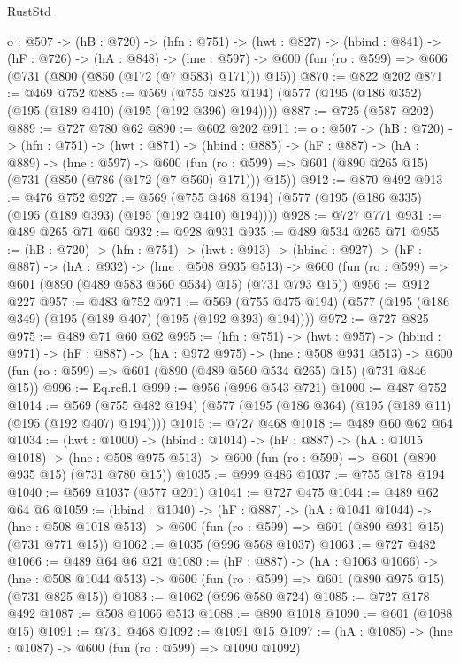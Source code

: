 \begin{lexlean}{RustStd}
\begin{coremodule}
  {o : @507} ->
  (hB : @720) ->
  (hfn : @751) ->
  (hwt : @827) ->
  (hbind : @841) ->
  (hF : @726) ->
  (hA : @848) ->
  (hne : @597) -> @600 (fun (ro : @599) => @606 (@731 (@800 (@850 (@172 (@7 @583) @171))) @15))
@870 := @822 @202
@871 := @469 @752
@885 := @569 (@755 @825 @194) (@577 (@195 (@186 @352) (@195 (@189 @410) (@195 (@192 @396) @194))))
@887 := @725 (@587 @202)
@889 := @727 @780 @62
@890 := @602 @202
@911 := {o : @507} ->
  (hB : @720) ->
  (hfn : @751) ->
  (hwt : @871) ->
  (hbind : @885) ->
  (hF : @887) ->
  (hA : @889) ->
  (hne : @597) ->
  @600 (fun (ro : @599) => @601 (@890 @265 @15) (@731 (@850 (@786 (@172 (@7 @560) @171))) @15))
@912 := @870 @492
@913 := @476 @752
@927 := @569 (@755 @468 @194) (@577 (@195 (@186 @335) (@195 (@189 @393) (@195 (@192 @410) @194))))
@928 := @727 @771
@931 := @489 @265 @71 @60
@932 := @928 @931
@935 := @489 @534 @265 @71
@955 := (hB : @720) ->
  (hfn : @751) ->
  (hwt : @913) ->
  (hbind : @927) ->
  (hF : @887) ->
  (hA : @932) ->
  (hne : @508 @935 @513) ->
  @600 (fun (ro : @599) => @601 (@890 (@489 @583 @560 @534) @15) (@731 @793 @15))
@956 := @912 @227
@957 := @483 @752
@971 := @569 (@755 @475 @194) (@577 (@195 (@186 @349) (@195 (@189 @407) (@195 (@192 @393) @194))))
@972 := @727 @825
@975 := @489 @71 @60 @62
@995 := (hfn : @751) ->
  (hwt : @957) ->
  (hbind : @971) ->
  (hF : @887) ->
  (hA : @972 @975) ->
  (hne : @508 @931 @513) ->
  @600 (fun (ro : @599) => @601 (@890 (@489 @560 @534 @265) @15) (@731 @846 @15))
@996 := Eq.refl.{1}
@999 := @956 (@996 @543 @721)
@1000 := @487 @752
@1014 := @569 (@755 @482 @194) (@577 (@195 (@186 @364) (@195 (@189 @11) (@195 (@192 @407) @194))))
@1015 := @727 @468
@1018 := @489 @60 @62 @64
@1034 := (hwt : @1000) ->
  (hbind : @1014) ->
  (hF : @887) ->
  (hA : @1015 @1018) ->
  (hne : @508 @975 @513) -> @600 (fun (ro : @599) => @601 (@890 @935 @15) (@731 @780 @15))
@1035 := @999 @486
@1037 := @755 @178 @194
@1040 := @569 @1037 (@577 @201)
@1041 := @727 @475
@1044 := @489 @62 @64 @6
@1059 := (hbind : @1040) ->
  (hF : @887) ->
  (hA : @1041 @1044) ->
  (hne : @508 @1018 @513) -> @600 (fun (ro : @599) => @601 (@890 @931 @15) (@731 @771 @15))
@1062 := @1035 (@996 @568 @1037)
@1063 := @727 @482
@1066 := @489 @64 @6 @21
@1080 := (hF : @887) ->
  (hA : @1063 @1066) ->
  (hne : @508 @1044 @513) -> @600 (fun (ro : @599) => @601 (@890 @975 @15) (@731 @825 @15))
@1083 := @1062 (@996 @580 @724)
@1085 := @727 @178 @492
@1087 := @508 @1066 @513
@1088 := @890 @1018
@1090 := @601 (@1088 @15)
@1091 := @731 @468
@1092 := @1091 @15
@1097 := (hA : @1085) -> (hne : @1087) -> @600 (fun (ro : @599) => @1090 @1092)

\end{coremodule}
\end{lexlean}
